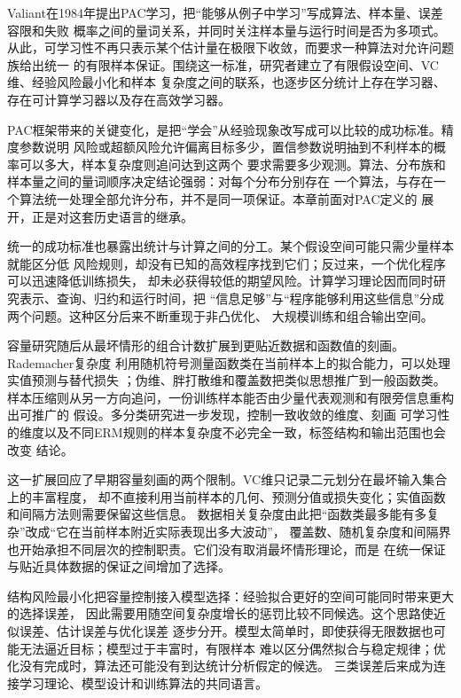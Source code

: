 Valiant在1984年提出PAC学习，把“能够从例子中学习”写成算法、样本量、误差容限和失败
概率之间的量词关系，并同时关注样本量与运行时间是否为多项式。
从此，可学习性不再只表示某个估计量在极限下收敛，而要求一种算法对允许问题族给出统一
的有限样本保证。围绕这一标准，研究者建立了有限假设空间、VC维、经验风险最小化和样本
复杂度之间的联系，也逐步区分统计上存在学习器、存在可计算学习器以及存在高效学习器。

PAC框架带来的关键变化，是把“学会”从经验现象改写成可以比较的成功标准。精度参数说明
风险或超额风险允许偏离目标多少，置信参数说明抽到不利样本的概率可以多大，样本复杂度则追问达到这两个
要求需要多少观测。算法、分布族和样本量之间的量词顺序决定结论强弱：对每个分布分别存在
一个算法，与存在一个算法统一处理全部允许分布，并不是同一项保证。本章前面对PAC定义的
展开，正是对这套历史语言的继承。

统一的成功标准也暴露出统计与计算之间的分工。某个假设空间可能只需少量样本就能区分低
风险规则，却没有已知的高效程序找到它们；反过来，一个优化程序可以迅速降低训练损失，
却未必获得较低的期望风险。计算学习理论因而同时研究表示、查询、归约和运行时间，把
“信息足够”与“程序能够利用这些信息”分成两个问题。这种区分后来不断重现于非凸优化、
大规模训练和组合输出空间。

容量研究随后从最坏情形的组合计数扩展到更贴近数据和函数值的刻画。Rademacher复杂度
利用随机符号测量函数类在当前样本上的拟合能力，可以处理实值预测与替代损失
；伪维、胖打散维和覆盖数把类似思想推广到一般函数类。
样本压缩则从另一方向追问，一份训练样本能否由少量代表观测和有限旁信息重构出可推广的
假设。多分类研究进一步发现，控制一致收敛的维度、刻画
可学习性的维度以及不同ERM规则的样本复杂度不必完全一致，标签结构和输出范围也会改变
结论。

这一扩展回应了早期容量刻画的两个限制。VC维只记录二元划分在最坏输入集合上的丰富程度，
却不直接利用当前样本的几何、预测分值或损失变化；实值函数和间隔方法则需要保留这些信息。
数据相关复杂度由此把“函数类最多能有多复杂”改成“它在当前样本附近实际表现出多大波动”，
覆盖数、随机复杂度和间隔界也开始承担不同层次的控制职责。它们没有取消最坏情形理论，而是
在统一保证与贴近具体数据的保证之间增加了选择。

结构风险最小化把容量控制接入模型选择：经验拟合更好的空间可能同时带来更大的选择误差，
因此需要用随空间复杂度增长的惩罚比较不同候选。这个思路使近似误差、估计误差与优化误差
逐步分开。模型太简单时，即使获得无限数据也可能无法逼近目标；模型过于丰富时，有限样本
难以区分偶然拟合与稳定规律；优化没有完成时，算法还可能没有到达统计分析假定的候选。
三类误差后来成为连接学习理论、模型设计和训练算法的共同语言。

